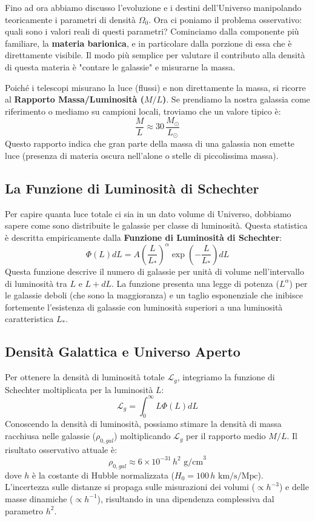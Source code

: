 \documentclass[11pt,a4paper]{report}
\begin{document}
Fino ad ora abbiamo discusso l'evoluzione e i destini dell'Universo manipolando teoricamente i parametri di densità $\Omega_0$. Ora ci poniamo il problema osservativo: quali sono i valori reali di questi parametri?
Cominciamo dalla componente più familiare, la \textbf{materia barionica}, e in particolare dalla porzione di essa che è direttamente visibile. Il modo più semplice per valutare il contributo alla densità di questa materia è "contare le galassie" e misurarne la massa.

Poiché i telescopi misurano la luce (flussi) e non direttamente la massa, si ricorre al \textbf{Rapporto Massa/Luminosità ($M/L$)}. Se prendiamo la nostra galassia come riferimento o mediamo su campioni locali, troviamo che un valore tipico è:
\begin{equation}
\frac{M}{L} \approx 30 \, \frac{M_\odot}{L_\odot}
\end{equation}
Questo rapporto indica che gran parte della massa di una galassia non emette luce (presenza di materia oscura nell'alone o stelle di piccolissima massa).

\subsection{La Funzione di Luminosità di Schechter}
Per capire quanta luce totale ci sia in un dato volume di Universo, dobbiamo sapere come sono distribuite le galassie per classe di luminosità. Questa statistica è descritta empiricamente dalla \textbf{Funzione di Luminosità di Schechter}:
\begin{equation}
\Phi(L) dL = A \left( \frac{L}{L_*} \right)^\alpha \exp\left( - \frac{L}{L_*} \right) dL
\end{equation}
Questa funzione descrive il numero di galassie per unità di volume nell'intervallo di luminosità tra $L$ e $L+dL$. La funzione presenta una legge di potenza ($L^\alpha$) per le galassie deboli (che sono la maggioranza) e un taglio esponenziale che inibisce fortemente l'esistenza di galassie con luminosità superiori a una luminosità caratteristica $L_*$.

\subsection{Densità Galattica e Universo Aperto}
Per ottenere la densità di luminosità totale $\mathcal{L}_g$, integriamo la funzione di Schechter moltiplicata per la luminosità $L$:
\begin{equation}
\mathcal{L}_g = \int_0^\infty L \Phi(L) dL
\end{equation}
Conoscendo la densità di luminosità, possiamo stimare la densità di massa racchiusa nelle galassie ($\rho_{0,gal}$) moltiplicando $\mathcal{L}_g$ per il rapporto medio $M/L$. Il risultato osservativo attuale è:
\begin{equation}
\rho_{0,gal} \approx 6 \times 10^{-31} \, h^2 \text{ g/cm}^3
\end{equation}
dove $h$ è la costante di Hubble normalizzata ($H_0 = 100 \, h \text{ km/s/Mpc}$). L'incertezza sulle distanze si propaga sulle misurazioni dei volumi ($\propto h^{-3}$) e delle masse dinamiche ($\propto h^{-1}$), risultando in una dipendenza complessiva dal parametro $h^2$.
\end{document}
